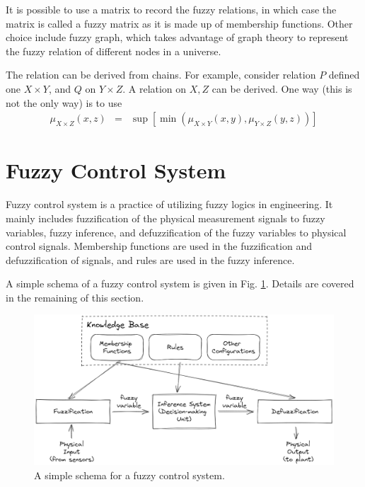It is possible to use a matrix to record the fuzzy relations, in which case the matrix is called a fuzzy matrix as it is made up of membership functions. Other choice include fuzzy graph, which takes advantage of graph theory to represent the fuzzy relation of different nodes in a universe.

The relation can be derived from chains. For example, consider relation $P$ defined one $X \times Y$, and $Q$ on $Y \times Z$. A relation on $X, Z$ can be derived. One way (this is not the only way) is to use
\begin{eqnarray}
	\mu_{X \times Z}(x, z) &=& \sup \left[\min\left(\mu_{X\times Y}(x, y), \mu_{Y\times Z} (y, z)\right)\right] \nonumber
\end{eqnarray}

\section{Fuzzy Control System}

Fuzzy control system is a practice of utilizing fuzzy logics in engineering. It mainly includes fuzzification of the physical measurement signals to fuzzy variables, fuzzy inference, and defuzzification of the fuzzy variables to physical control signals. Membership functions are used in the fuzzification and defuzzification of signals, and rules are used in the fuzzy inference.

A simple schema of a fuzzy control system is given in Fig. \ref{ch:fcs:fig:fuzzyschemasimple}. Details are covered in the remaining of this section.

\begin{figure}
	\centering
	\includegraphics[width=350pt]{chapters/ch-fuzzy-control-system/figures/fuzzyschemasimple.png}
	\caption{A simple schema for a fuzzy control system.}
	\label{ch:fcs:fig:fuzzyschemasimple}
\end{figure}

